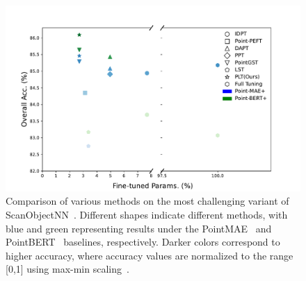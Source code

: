 \begin{figure}
    \centering
    \includegraphics[width=\linewidth]{fig/sota.pdf}
    \caption{Comparison of various methods on the most challenging variant of ScanObjectNN~\cite{uy2019revisiting}. Different shapes indicate different methods, with blue and green representing results under the PointMAE~\cite{pang2022masked} and PointBERT~\cite{yu2022point} baselines, respectively. Darker colors correspond to higher accuracy, where accuracy values are normalized to the range [0,1] using max-min scaling~\cite{panda2014smoothing}.
}
    \label{fig:sota}
\end{figure}